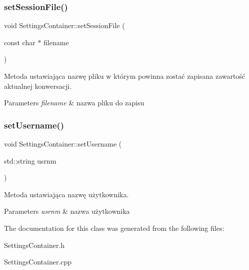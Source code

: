 \subsubsection{\texorpdfstring{setSessionFile()}{setSessionFile()}}
{\footnotesize\ttfamily void Settings\+Container\+::set\+Session\+File (\begin{DoxyParamCaption}\item[{const char $\ast$}]{filename }\end{DoxyParamCaption})\hspace{0.3cm}{\ttfamily [inline]}}



Metoda ustawiająca nazwę pliku w którym powinna zostać zapisana zawartość aktualnej konwersacji. 


\begin{DoxyParams}{Parameters}
{\em filename} & nazwa pliku do zapisu \\
\hline
\end{DoxyParams}
\mbox{\label{class_settings_container_a8badba41708e07b0af50e30f1e0bc78a}} 
\subsubsection{\texorpdfstring{setUsername()}{setUsername()}}
{\footnotesize\ttfamily void Settings\+Container\+::set\+Username (\begin{DoxyParamCaption}\item[{std\+::string}]{usrnm }\end{DoxyParamCaption})\hspace{0.3cm}{\ttfamily [inline]}}



Metoda ustawiająca nazwę użytkownika. 


\begin{DoxyParams}{Parameters}
{\em usrnm} & nazwa użytkownika \\
\hline
\end{DoxyParams}


The documentation for this class was generated from the following files\+:\begin{DoxyCompactItemize}
\item 
Settings\+Container.\+h\item 
Settings\+Container.\+cpp\end{DoxyCompactItemize}
